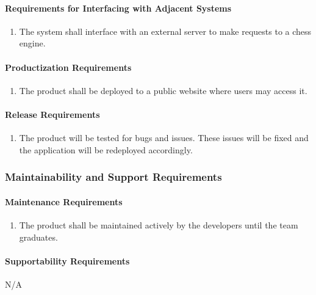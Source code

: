 \documentclass[12pt]{article}
\begin{document}
{\paragraph{Requirements for Interfacing with Adjacent Systems}
\begin{enumerate}[{OE}1., leftmargin=2\parindent, resume]
    \item The system shall interface with an external server to make requests to a chess engine.
\end{enumerate}

\paragraph{Productization Requirements}
\begin{enumerate}[{OE}1., leftmargin=2\parindent, resume]
    \item The product shall be deployed to a public website where users may access it.
\end{enumerate}

\paragraph{Release Requirements}
\begin{enumerate}[{OE}1., leftmargin=2\parindent, resume]
    \item The product will be tested for bugs and issues. These issues will be fixed and the application will be redeployed accordingly.
\end{enumerate}



\subsubsection{Maintainability and Support Requirements}
\label{NFR_MS}
\paragraph{Maintenance Requirements}
\begin{enumerate}[{MS}1., leftmargin=2\parindent]
    \item The product shall be maintained actively by the developers until the \progname{} team graduates.
\end{enumerate}

\paragraph{Supportability Requirements}
N/A

}
\end{document}
